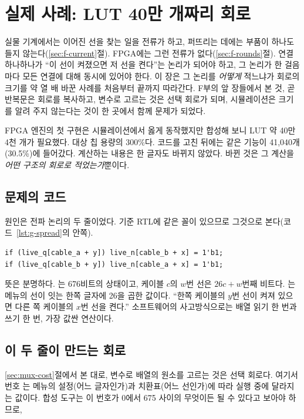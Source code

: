 \chapter{실제 사례: LUT 40만 개짜리 회로}\label{ch:lesson}

실물 기계에서는 이어진 선을 찾는 일을 전류가 하고, 퍼뜨리는 데에는 부품이 하나도 들지 않는다(\ref{sec:f-current}절).
FPGA에는 그런 전류가 없다(\ref{sec:f-rounds}절). 연결 하나하나가 ``이 선이 켜졌으면 저 선을 켠다''는 논리가 되어야
하고, 그 논리가 한 걸음마다 모든 연결에 대해 동시에 있어야 한다. 이 장은 그 논리를 \emph{어떻게} 적느냐가
회로의 크기를 약 열 배 바꾼 사례를 처음부터 끝까지 따라간다. F부의 앞 장들에서 본 것, 곧 반복문은 회로를
복사하고, 변수로 고르는 것은 선택 회로가 되며, 시뮬레이션은 크기를 알려 주지 않는다는 것이 한 곳에서 함께
문제가 되었다.

FPGA 엔진의 첫 구현은 시뮬레이션에서 옳게 동작했지만 합성해 보니 LUT 약 40만 4천 개가 필요했다. 대상 칩 용량의 300\%다.
코드를 고친 뒤에는 같은 기능이 41,040개(30.5\%)에 들어갔다. 계산하는 내용은 한 글자도 바뀌지 않았다.
바뀐 것은 그 계산을 \emph{어떤 구조의 회로로 적었는가}뿐이다.

\section{문제의 코드}

원인은 전파 논리의 두 줄이었다. 기준 RTL에 같은 꼴이 있으므로 그것으로 본다(코드~\ref{lst:g-spread}의 안쪽).

\begin{lstlisting}[language=SV,numbers=none]
if (live_q[cable_a + y]) live_n[cable_b + x] = 1'b1;
if (live_q[cable_b + y]) live_n[cable_a + x] = 1'b1;
\end{lstlisting}

뜻은 분명하다. 는 676비트의 상태이고, 케이블 $c$의 $w$번 선은 $26c + w$번째 비트다.
는 메뉴의 선이 잇는 한쪽 글자에 26을 곱한 값이다. ``한쪽 케이블의 $y$번 선이 켜져 있으면
다른 쪽 케이블의 $x$번 선을 켠다.'' 소프트웨어의 사고방식으로는 배열 읽기 한 번과 쓰기 한 번,
가장 값싼 연산이다.

\section{이 두 줄이 만드는 회로}

\Why \ref{sec:mux-cost}절에서 본 대로, 변수로 배열의 원소를 고르는 것은 선택 회로다. 여기서 번호
는 메뉴의 설정(어느 글자인가)과 치환표(어느 선인가)에 따라 실행 중에 달라지는 값이다.
합성 도구는 이 번호가 0에서 675 사이의 무엇이든 될 수 있다고 보아야 하므로,

